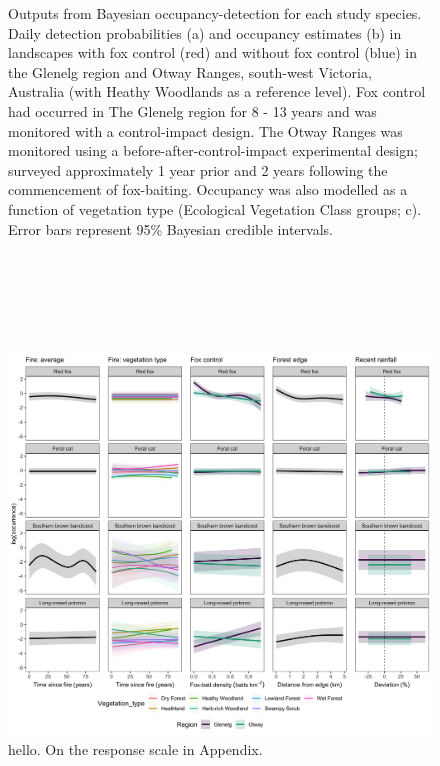 \documentclass[11pt,a4paper,titlepage,twoside,openright]{style/unimelbthesis}
\begin{document}
\begin{mainmatter}
\begin{figure}
\caption{Outputs from Bayesian occupancy-detection for each study species. Daily detection probabilities (a) and occupancy estimates (b) in landscapes with fox control (red) and without fox control (blue) in the Glenelg region and Otway Ranges, south-west Victoria, Australia (with Heathy Woodlands as a reference level). Fox control had occurred in The Glenelg region for 8 - 13 years and was monitored with a control-impact design. The Otway Ranges was monitored using a before-after-control-impact experimental design; surveyed approximately 1 year prior and 2 years following the commencement of fox-baiting. Occupancy was also modelled as a function of vegetation type (Ecological Vegetation Class groups; c). Error bars represent 95\% Bayesian credible intervals.}\label{fig:occ-det}
\end{figure}
\newpage

\(~\)

\(~\)

\(~\)
\begin{figure}

{\centering \includegraphics[width=1\linewidth]{figure/occurrence_gams_main} 

}

\caption{hello. On the response scale in Appendix.}\label{fig:gams-occ-main}
\end{figure}
\newpage

\(~\)

\(~\)


\end{mainmatter}
\end{document}
